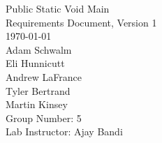 \begin{titlepage}
\begin{center}

\vspace*{3.0 cm}
{\Huge Public Static Void Main}\\[0.7cm]
{\Large Requirements Document, Version 1}\\[3.8cm]
{\Large \today}\\[0.5cm]
Adam Schwalm\\
Eli Hunnicutt\\
Andrew LaFrance\\
Tyler Bertrand\\
Martin Kinsey\\[4.0cm]

Group Number: 5\\
Lab Instructor: Ajay Bandi
  

  
\end{center}
\end{titlepage}

